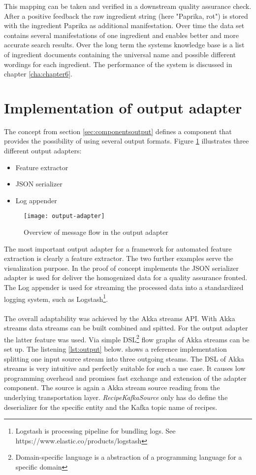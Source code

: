 This mapping can be taken and verified in a downstream quality assurance check. After a positive feedback the raw ingredient string (here "Paprika, rot") is stored with the ingredient Paprika as additional manifestation. Over time the data set contains several manifestations of one ingredient and enables better and more accurate search results. Over the long term the systems knowledge base is a list of ingredient documents containing the universal name and possible different wordings for each ingredient. The performance of the system is discussed in chapter \ref{cha:chapter6}.

\section{Implementation of output adapter}

The concept from section \ref{sec:componentsoutput} defines a component that provides the possibility of using several output formats. Figure \ref{fig:output-adapter} illustrates three different output adapters:
\begin{itemize}
\item Feature extractor
\item JSON serializer
\item Log appender
\end{itemize}

\begin{figure}[htb]
  \centering
  \texttt{[image: output-adapter]}\\
  \caption{Overview of message flow in the output adapter}
  \label{fig:output-adapter}
\end{figure}

The most important output adapter for a framework for automated feature extraction is clearly a feature extractor. The two further examples serve the visualization purpose. In the proof of concept implements the JSON serializer adapter is used for deliver the homogenized data for a quality assurance fronted. The Log appender is used for streaming the processed data into a standardized logging system, such as Logstash\footnote{Logstash is processing pipeline for bundling logs. See https://www.elastic.co/products/logstash}. 
\\\\
The overall adaptability was achieved by the Akka streams API. With Akka streams data streams can be built combined and spitted. For the output adapter the latter feature was used. Via simple DSL\footnote{Domain-specific language is a abstraction of a programming language for a specific domain} flow graphs of Akka streams can be set up. The listening \ref{lst:output} below. shows a reference implementation splitting one input source stream into three outgoing steams. The DSL of Akka streams is very intuitive and perfectly suitable for such a use case. It causes low programming overhead and promises fast exchange and extension of the adapter component. The source is again a Akka stream source reading from the underlying transportation layer. \textit{RecipeKafkaSource} only has do define the deserializer for the specific entity and the Kafka topic name of recipes.

